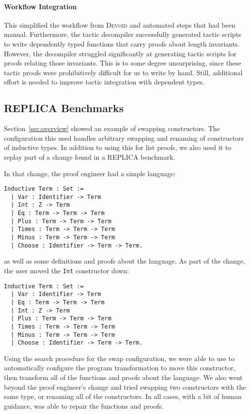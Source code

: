 \paragraph{Workflow Integration}
This simplified the workflow from \textsc{Devoid} and automated steps that had been manual.
Furthermore, the tactic decompiler successfully generated tactic scripts to write dependently typed
functions that carry proofs about length invariants.
However, the decompiler struggled significantly at generating tactic scripts for proofs relating those invariants.
This is to some degree unsurprising, since these tactic proofs
were prohibitively difficult for us to write by hand.
Still, additional effort is needed to improve tactic integration with dependent types.

\subsection{REPLICA Benchmarks}
\label{sec:replica}

Section~\ref{sec:overview} showed an example of swapping constructors.
The configuration this used handles arbitrary swapping and renaming of constructors of inductive types.
In addition to using this for list proofs, we also used it to replay part of a change found in
a REPLICA benchmark.

In that change, the proof engineer had a simple language:

\begin{lstlisting}
Inductive Term : Set :=
  | Var : Identifier -> Term
  | Int : Z -> Term
  | Eq : Term -> Term -> Term
  | Plus : Term -> Term -> Term
  | Times : Term -> Term -> Term
  | Minus : Term -> Term -> Term
  | Choose : Identifier -> Term -> Term.
\end{lstlisting}
as well as some definitions and proofs about the language.
As part of the change, the user moved the \lstinline{Int} constructor down:

\begin{lstlisting}
Inductive Term : Set :=
  | Var : Identifier -> Term
  | Eq : Term -> Term -> Term
  | Int : Z -> Term
  | Plus : Term -> Term -> Term
  | Times : Term -> Term -> Term
  | Minus : Term -> Term -> Term
  | Choose : Identifier -> Term -> Term.
\end{lstlisting}

Using the search procedure for the swap configuration, we were able to use \toolname
to automatically configure the program transformation to move this constructor,
then transform all of the functions and proofs about the language.
We also went beyond the proof engineer's change and tried swapping two constructors with the same type,
or renaming all of the constructors.
In all cases, with a bit of human guidance, \toolname was able to repair the functions and proofs.

